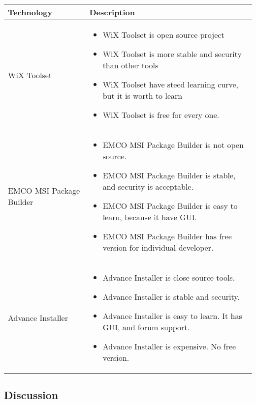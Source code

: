 \begin{center}
    \begin{tabular}{ | l | p{10cm} |}
    \hline
    Technology & Description  \\ \hline
    WiX Toolset \cite{Wix_tool} &
    \begin{itemize}
      \item WiX Toolset is open source project 
      \item WiX Toolset is more stable and security than other tools
      \item WiX Toolset have steed learning curve, but it is worth to learn
      \item WiX	Toolset is free for every one.
    \end{itemize}\\ \hline
    EMCO MSI Package Builder \cite{EMCO_MSI} &
    \begin{itemize}
      \item EMCO MSI Package Builder is not open source.
      \item EMCO MSI Package Builder is stable, and security is acceptable.
      \item EMCO MSI Package Builder is easy to learn, because it have GUI.
      \item EMCO MSI Package Builder has free version for individual developer.
    \end{itemize}\\ \hline
    Advance Installer \cite{advanced_install} &
    \begin{itemize}
      \item Advance Installer is close source tools.
      \item Advance Installer is stable and security.
      \item Advance Installer is easy to learn. It has GUI, and forum support.
      \item Advance Installer is expensive. No free version.
    \end{itemize}\\ \hline
    \end{tabular}
\end{center}

\subsection{Discussion}


